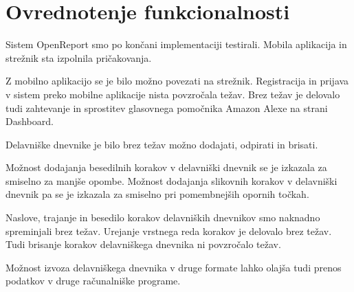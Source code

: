 \documentclass[a4paper, 12pt]{book}
\begin{document}



\section{Ovrednotenje funkcionalnosti}


Sistem OpenReport smo po končani implementaciji testirali. 
Mobila aplikacija in strežnik sta izpolnila pričakovanja.

Z mobilno aplikacijo se je bilo možno povezati na strežnik.
Registracija in prijava v sistem preko mobilne aplikacije nista povzročala težav.
Brez težav je delovalo tudi zahtevanje in sprostitev glasovnega pomočnika Amazon Alexe na strani Dashboard.

Delavniške dnevnike je bilo brez težav možno dodajati, odpirati in brisati.

Možnost dodajanja besedilnih korakov v delavniški dnevnik se je izkazala za smiselno za manjše opombe.
Možnost dodajanja slikovnih korakov v delavniški dnevnik pa se je izkazala za smiselno pri pomembnejših opornih točkah.

Naslove, trajanje in besedilo korakov delavniških dnevnikov smo naknadno spreminjali brez težav.
Urejanje vrstnega reda korakov je delovalo brez težav.
Tudi brisanje korakov delavniškega dnevnika ni povzročalo težav.

Možnost izvoza delavniškega dnevnika v druge formate lahko olajša tudi prenos podatkov v druge računalniške programe.


\bigbreak
\end{document}
